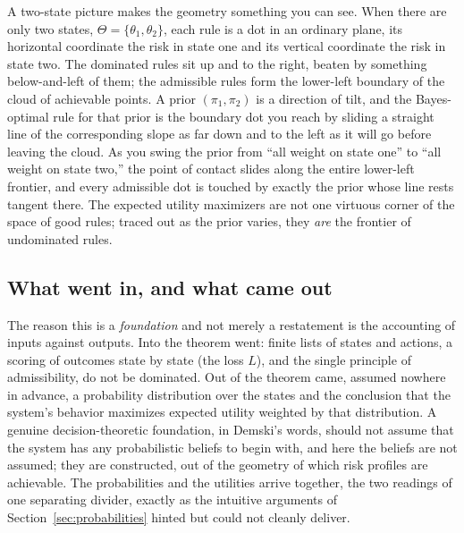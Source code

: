 \documentclass[10pt]{article}
\theoremstyle{definition}
\theoremstyle{remark}
\begin{document}
A two-state picture makes the geometry something you can see. When there are only two states, $\Theta = \{\theta_1, \theta_2\}$, each rule is a dot in an ordinary plane, its horizontal coordinate the risk in state one and its vertical coordinate the risk in state two. The dominated rules sit up and to the right, beaten by something below-and-left of them; the admissible rules form the lower-left boundary of the cloud of achievable points. A prior $(\pi_1, \pi_2)$ is a direction of tilt, and the Bayes-optimal rule for that prior is the boundary dot you reach by sliding a straight line of the corresponding slope as far down and to the left as it will go before leaving the cloud. As you swing the prior from ``all weight on state one'' to ``all weight on state two,'' the point of contact slides along the entire lower-left frontier, and every admissible dot is touched by exactly the prior whose line rests tangent there. The expected utility maximizers are not one virtuous corner of the space of good rules; traced out as the prior varies, they \emph{are} the frontier of undominated rules.

\subsection{What went in, and what came out}

The reason this is a \emph{foundation} and not merely a restatement is the accounting of inputs against outputs. Into the theorem went: finite lists of states and actions, a scoring of outcomes state by state (the loss $L$), and the single principle of admissibility, do not be dominated. Out of the theorem came, assumed nowhere in advance, a probability distribution over the states and the conclusion that the system's behavior maximizes expected utility weighted by that distribution. A genuine decision-theoretic foundation, in Demski's words, should not assume that the system has any probabilistic beliefs to begin with, and here the beliefs are not assumed; they are constructed, out of the geometry of which risk profiles are achievable. The probabilities and the utilities arrive together, the two readings of one separating divider, exactly as the intuitive arguments of Section~\ref{sec:probabilities} hinted but could not cleanly deliver.
\end{document}
